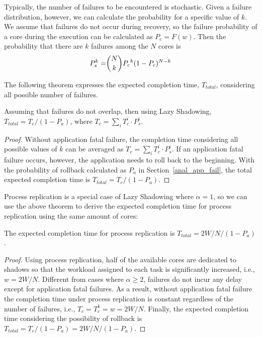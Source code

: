 Typically, the number of failures to be encountered is stochastic. Given a failure distribution, however, we can calculate the probability for a specific value of $k$. We assume that failures do not occur during recovery, so the failure probability of a core during the execution can be calculated as $P_c = F(w)$. Then the probability that there are $k$ failures among the $N$ cores is 
\begin{equation}
\begin{split}
P_s^{k}= & \dbinom{N}{k}{P_c}^k(1-P_c)^{N-k} \\
\end{split}
\end{equation}

The following theorem expresses the expected completion time, $T_{total}$, considering all possible number of failures. 

\begin{theorem}
Assuming that failures do not overlap, then using Lazy Shadowing,
$T_{total} = T_{c} / (1 - P_a)$, where $T_{c} = \sum_{i} T_{c}^{i} \cdot P_s^{i}$.
\end{theorem}
\begin{proof}
Without application fatal failure, the completion time considering all possible values of $k$ can be averaged as $T_{c} = \sum_{i} T_{c}^{i} \cdot P_s^{i}$. If an application fatal failure occurs, however, the application needs to roll back to the beginning. With the probability of rollback calculated as $P_a$ in Section~\ref{anal_app_fail}, the total expected completion time is $T_{total} = T_{c} / (1 - P_a)$.
\end{proof}

Process replication is a special case of Lazy Shadowing where $\alpha=1$, so we can use the above theorem to derive the expected completion time for process replication using the same amount of cores:

\begin{corollary}
The expected completion time for process replication is $T_{total} = 2W/N / (1 - P_a)$.
\end{corollary}
\begin{proof}
Using process replication, half of the available cores are dedicated to shadows so that the workload assigned to each task is significantly increased, i.e., $w=2W/N$. Different from cases where $\alpha \ge 2$, failures do not incur any delay except for application fatal failures. %
As a result, without application fatal failure the completion time under process replication is constant regardless of the number of failures, i.e., $T_c=T_c^k=w=2W/N$. Finally, the expected completion time considering the possibility of rollback is $T_{total} = T_c / (1 - P_a) = 2W/N / (1 - P_a)$.
\end{proof}

